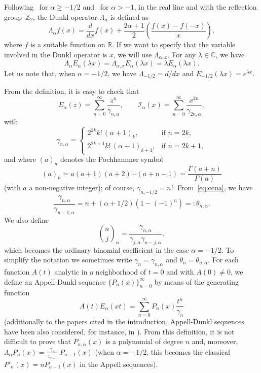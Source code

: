 \documentclass[a4paper]{amsart}
\newcommand{\Z}{\mathbb{Z}}
\newcommand{\R}{\mathbb{R}}
\newcommand{\C}{\mathbb{C}}
\newcommand{\I}{\mathcal{I}}
\newcommand{\Ea}{E_{\alpha}}
\newcommand{\cc}{\gamma}
\newcommand{\La}{\Lambda_{\alpha}}
\newcommand{\Lax}{\Lambda_{\alpha,x}}
\newcommand{\binoma}[2]{\binom{#1}{#2}_{\!\alpha}}
\theoremstyle{plain}
\theoremstyle{definition}
\theoremstyle{remark}
\numberwithin{equation}{section}
\begin{document}
Following~\cite{Du} for $\alpha\ge-1/2$ and~\cite{Ros} for $\alpha>-1$, in the real line and with the reflection group~$\Z_2$, the Dunkl operator $\La$ is defined as
\begin{equation}
\label{eq:Duop}
  \La f(x) = \frac{d}{dx}f(x) + \frac{2\alpha+1}{2}
  \left(\frac{f(x)-f(-x)}{x}\right),
\end{equation}
where $f$ is a suitable function on $\R$. If we want to specify that the variable involved in the Dunkl operator is $x$, we will use $\Lax$.
For any $\lambda \in \C$, we have
\begin{equation}
\label{eq:LDu}
  \La \Ea(\lambda x) = \Lax \Ea(\lambda x) = \lambda \Ea(\lambda x).
\end{equation}
Let us note that, when $\alpha = -1/2$, we have $\Lambda_{-1/2} = d/dx$ and $E_{-1/2}(\lambda x) = e^{\lambda x}$.

From the definition, it is easy to check that
\[
  \Ea(z) = \sum_{n=0}^\infty \frac{z^n}{\cc_{n,\alpha}},
  \qquad
  \I_{\alpha}(x) = \sum_{n=0}^\infty \frac{x^{2n}}{\cc_{2n,\alpha}},
\]
with 
\begin{equation}
\label{eq:ccna}
\cc_{n,\alpha} =
\begin{cases} 
  2^{2k}k!\,(\alpha+1)_k, & \text{if $n=2k$},\\
  2^{2k+1}k!\,(\alpha+1)_{k+1}, & \text{if $n=2k+1$},
\end{cases}
\end{equation}
and where $(a)_n$ denotes the Pochhammer symbol
\[
  (a)_n = a(a+1)(a+2) \cdots (a+n-1) = \frac{\Gamma(a+n)}{\Gamma(a)}
\]
(with $a$ a non-negative integer); of course, $\cc_{n,-1/2} = n!$.
From~\eqref{eq:ccna}, we have
\begin{equation}
\label{eq:coccc}
  \frac{\cc_{n,\alpha}}{\cc_{n-1,\alpha}} = n+(\alpha+1/2)(1-(-1)^n) =: \theta_{n,\alpha}.
\end{equation}
We also define
\[
  \binoma{n}{j} = \frac{\cc_{n,\alpha}}{\cc_{j,\alpha}\cc_{n-j,\alpha}},
\]
which becomes the ordinary binomial coefficient in the case $\alpha=-1/2$.
To simplify the notation we sometimes write $\cc_n=\cc_{n,\alpha}$ and $\theta_n=\theta_{n,\alpha}$.
For each function $A(t)$ analytic in a neighborhood of $t=0$ and with $A(0) \ne 0$, we define an Appell-Dunkl sequence $\{P_{n}(x)\}_{n=0}^{\infty}$ by means of the generating function
\begin{equation}
\label{eq:ad}
  A(t)\Ea(xt) = \sum_{n=0}^\infty P_{n}(x) \frac{t^n}{\cc_n}
\end{equation}
(additionally to the papers \cite{AlS, Ros} cited in the introduction, Appell-Dunkl sequences have been also considered, for instance, in \cite{BG, BKI, DH}).
From this definition, it is not difficult to prove that $P_{n,\alpha}(x)$ is a polynomial of degree $n$ and, moreover, $\La P_{n}(x) = \frac{\cc_{n}}{\cc_{n-1}}\, P_{n-1}(x)$ (when $\alpha=-1/2$, this becomes the classical $P'_{n}(x) = nP_{n-1}(x)$ in the Appell sequences). 
\end{document}
